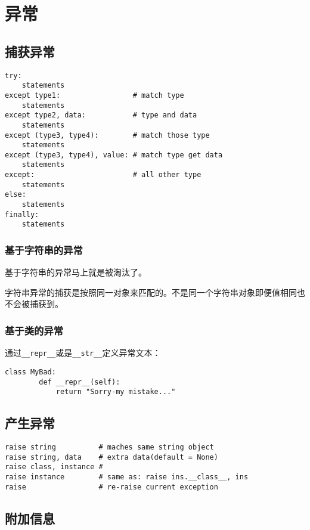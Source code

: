 \chapter{异常}

\section{捕获异常}

\begin{lstlisting}
try:
	statements
except type1:                 # match type
	statements
except type2, data:           # type and data
	statements
except (type3, type4):        # match those type
	statements
except (type3, type4), value: # match type get data
	statements
except:                       # all other type
	statements
else:
	statements
finally:
	statements
\end{lstlisting}

\subsection{基于字符串的异常}

基于字符串的异常马上就是被淘汰了。

字符串异常的捕获是按照同一对象来匹配的。不是同一个字符串对象即便值相同也不会被捕获到。

\subsection{基于类的异常}

通过\verb|__repr__|或是\verb|__str__|定义异常文本：

\begin{lstlisting}
class MyBad:
		def __repr__(self):
			return "Sorry-my mistake..."
\end{lstlisting}

\section{产生异常}

\begin{lstlisting}
raise string          # maches same string object
raise string, data    # extra data(default = None)
raise class, instance # 
raise instance        # same as: raise ins.__class__, ins
raise                 # re-raise current exception
\end{lstlisting}

\section{附加信息}

